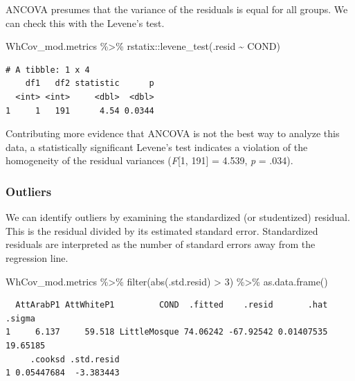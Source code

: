 \documentclass[
  11pt,
]{book}
\newenvironment{Shaded}{\begin{snugshade}}{\end{snugshade}}
\newcommand{\DecValTok}[1]{\textcolor[rgb]{0.00,0.00,0.81}{#1}}
\newcommand{\FunctionTok}[1]{\textcolor[rgb]{0.00,0.00,0.00}{#1}}
\newcommand{\NormalTok}[1]{#1}
\newcommand{\SpecialCharTok}[1]{\textcolor[rgb]{0.00,0.00,0.00}{#1}}
\begin{document}
ANCOVA presumes that the variance of the residuals is equal for all groups. We can check this with the Levene's test.

\begin{Shaded}
\begin{Highlighting}[]
\NormalTok{WhCov\_mod.metrics }\SpecialCharTok{\%\textgreater{}\%}
\NormalTok{    rstatix}\SpecialCharTok{::}\FunctionTok{levene\_test}\NormalTok{(.resid }\SpecialCharTok{\textasciitilde{}}\NormalTok{ COND)}
\end{Highlighting}
\end{Shaded}

\begin{verbatim}
# A tibble: 1 x 4
    df1   df2 statistic      p
  <int> <int>     <dbl>  <dbl>
1     1   191      4.54 0.0344
\end{verbatim}

Contributing more evidence that ANCOVA is not the best way to analyze this data, a statistically significant Levene's test indicates a violation of the homogeneity of the residual variances (\emph{F}{[}1, 191{]} = 4.539, \emph{p} = .034).

\hypertarget{outliers-1}{%
\subsubsection{Outliers}\label{outliers-1}}

We can identify outliers by examining the standardized (or studentized) residual. This is the residual divided by its estimated standard error. Standardized residuals are interpreted as the number of standard errors away from the regression line.

\begin{Shaded}
\begin{Highlighting}[]
\NormalTok{WhCov\_mod.metrics }\SpecialCharTok{\%\textgreater{}\%}
    \FunctionTok{filter}\NormalTok{(}\FunctionTok{abs}\NormalTok{(.std.resid) }\SpecialCharTok{\textgreater{}} \DecValTok{3}\NormalTok{) }\SpecialCharTok{\%\textgreater{}\%}
    \FunctionTok{as.data.frame}\NormalTok{()}
\end{Highlighting}
\end{Shaded}

\begin{verbatim}
  AttArabP1 AttWhiteP1         COND  .fitted    .resid       .hat   .sigma
1     6.137     59.518 LittleMosque 74.06242 -67.92542 0.01407535 19.65185
     .cooksd .std.resid
1 0.05447684  -3.383443
\end{verbatim}
\end{document}
